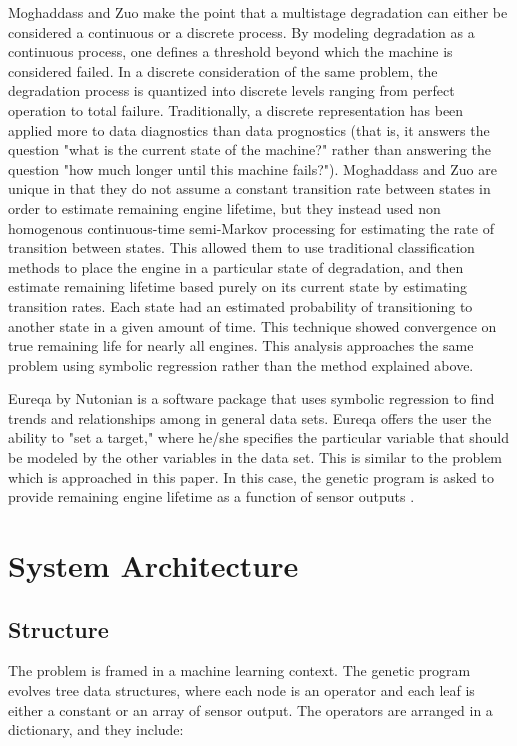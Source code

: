 \documentclass{acm_proc_article-sp}
\begin{document}
Moghaddass and Zuo make the point that a multistage degradation can either be considered a continuous or a discrete process. By modeling degradation as a continuous process, one defines a threshold beyond which the machine is considered failed. In a discrete consideration of the same problem, the degradation process is quantized into discrete levels ranging from perfect operation to total failure. Traditionally, a discrete representation has been applied more to data diagnostics than data prognostics (that is, it answers the question "what is the current state of the machine?" rather than answering the question "how much longer until this machine fails?").  Moghaddass and Zuo are unique in that they do not assume a constant transition rate between states in order to estimate remaining engine lifetime, but they instead used non homogenous continuous-time semi-Markov processing for estimating the rate of transition between states. This allowed them to use traditional classification methods to place the engine in a particular state of degradation, and then estimate remaining lifetime based purely on its current state by estimating transition rates. Each state had an estimated probability of transitioning to another state in a given amount of time. This technique showed convergence on true remaining life for nearly all engines. \cite{Mog} This analysis approaches the same problem using symbolic regression rather than the method explained above. 

Eureqa by Nutonian is a software package that uses symbolic regression to find trends and relationships among in general data sets. Eureqa offers the user the ability to "set a target," where he/she specifies the particular variable that should be modeled by the other variables in the data set. This is similar to the problem which is approached in this paper. In this case, the genetic program is asked to provide remaining engine lifetime as a function of sensor outputs \cite{nutonian}.

\section{System Architecture}
\subsection{Structure}
The problem is framed in a machine learning context. The genetic program evolves tree data structures, where each node is an operator and each leaf is either a constant or an array of sensor output. The operators are arranged in a dictionary, and they include:
\end{document}
